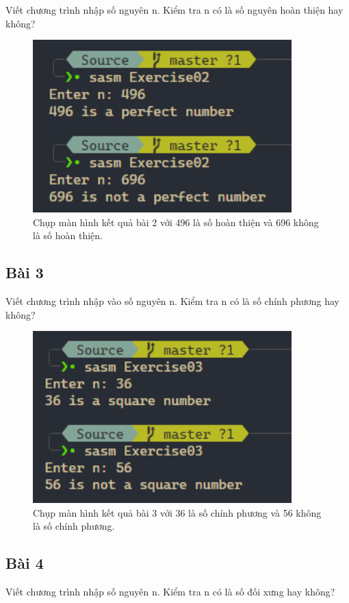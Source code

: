 Viết chương trình nhập số nguyên n. Kiểm tra n có là số nguyên hoàn thiện hay không?

\begin{figure}[H]
	\centering
	\includegraphics[width=10cm]{images/img2.PNG}
	\caption{Chụp màn hình kết quả bài 2 với 496 là số hoàn thiện và 696 không là số hoàn thiện.}
\end{figure}

\subsection{Bài 3}

Viết chương trình nhập vào số nguyên n. Kiểm tra n có là số chính phương hay không?

\begin{figure}[H]
	\centering
	\includegraphics[width=10cm]{images/img3.PNG}
	\caption{Chụp màn hình kết quả bài 3 với 36 là số chính phương và 56 không là số chính phương.}
\end{figure}

\subsection{Bài 4}

Viết chương trình nhập số nguyên n. Kiểm tra n có là số đối xưng hay không?

